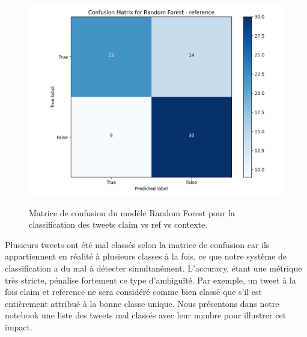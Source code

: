 \begin{figure}[h]
    \begin{minipage}[b]{0.45\textwidth}
        \centering
        \includegraphics[width=\textwidth]{images/confusion_3.json-Random Forest_reference_confusion_matrix}
        \label{fig:confusion_3_3}
    \end{minipage}
    \caption{Matrice de confusion du modèle Random Forest pour la classification des tweets claim vs ref vs contexte.}
    \label{fig:confusion_3}
\end{figure}

Plusieurs tweets ont été mal classés selon la matrice de confusion car ils appartiennent en réalité à plusieurs classes à la fois, ce que notre système de classification a du mal à détecter simultanément.
L’accuracy, étant une métrique très stricte, pénalise fortement ce type d’ambiguïté.
Par exemple, un tweet à la fois claim et reference ne sera considéré comme bien classé que s’il est entièrement attribué à la bonne classe unique.
Nous présentons dans notre notebook une liste des tweets mal classés avec leur nombre pour illustrer cet impact.
